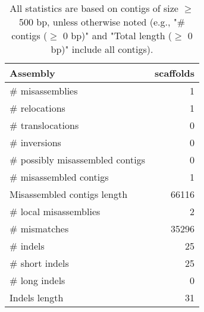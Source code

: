 \documentclass[12pt,a4paper]{article}
\begin{document}
\begin{table}[ht]
\begin{center}
\caption{All statistics are based on contigs of size $\geq$ 500 bp, unless otherwise noted (e.g., "\# contigs ($\geq$ 0 bp)" and "Total length ($\geq$ 0 bp)" include all contigs).}
\begin{tabular}{|l*{1}{|r}|}
\hline
Assembly & scaffolds \\ \hline
\# misassemblies & 1 \\ \hline
\hspace{5mm}\# relocations & 1 \\ \hline
\hspace{5mm}\# translocations & 0 \\ \hline
\hspace{5mm}\# inversions & 0 \\ \hline
\# possibly misassembled contigs & 0 \\ \hline
\# misassembled contigs & 1 \\ \hline
Misassembled contigs length & 66116 \\ \hline
\# local misassemblies & 2 \\ \hline
\# mismatches & 35296 \\ \hline
\# indels & 25 \\ \hline
\hspace{5mm}\# short indels & 25 \\ \hline
\hspace{5mm}\# long indels & 0 \\ \hline
Indels length & 31 \\ \hline
\end{tabular}
\end{center}
\end{table}
\end{document}
